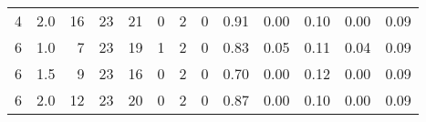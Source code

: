 \begin{tabular}{rrrrrrrrrrrrr}
                     4 &                        2.0 &                                 16 &                       23 &                      21 &                            0 &                         2 &                        0 &                          0.91 &                                0.00 &                                 0.10 &                            0.00 &                             0.09 \\
                     6 &                        1.0 &                                  7 &                       23 &                      19 &                            1 &                         2 &                        0 &                          0.83 &                                0.05 &                                 0.11 &                            0.04 &                             0.09 \\
                     6 &                        1.5 &                                  9 &                       23 &                      16 &                            0 &                         2 &                        0 &                          0.70 &                                0.00 &                                 0.12 &                            0.00 &                             0.09 \\
                     6 &                        2.0 &                                 12 &                       23 &                      20 &                            0 &                         2 &                        0 &                          0.87 &                                0.00 &                                 0.10 &                            0.00 &                             0.09 \\
\bottomrule
\end{tabular}
